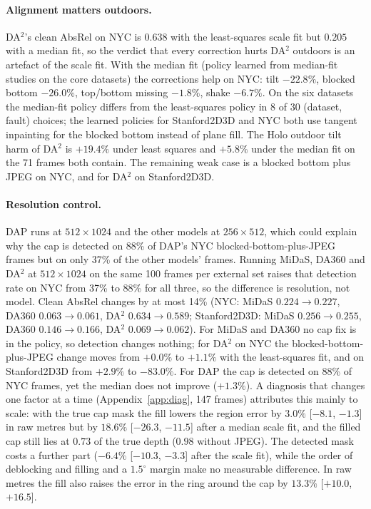\documentclass{article}
\newcommand{\absrel}{AbsRel}
\begin{document}
\paragraph{Alignment matters outdoors.} DA$^2$'s clean \absrel{} on NYC is $0.638$ with the least-squares scale fit but $0.205$ with a median fit, so the verdict that every correction hurts DA$^2$ outdoors is an artefact of the scale fit. With the median fit (policy learned from median-fit studies on the core datasets) the corrections help on NYC: tilt $-22.8\%$, blocked bottom $-26.0\%$, top/bottom missing $-1.8\%$, shake $-6.7\%$. On the six datasets the median-fit policy differs from the least-squares policy in 8 of 30 (dataset, fault) choices; the learned policies for Stanford2D3D and NYC both use tangent inpainting for the blocked bottom instead of plane fill. The Holo outdoor tilt harm of DA$^2$ is $+19.4\%$ under least squares and $+5.8\%$ under the median fit on the 71 frames both contain. The remaining weak case is a blocked bottom plus JPEG on NYC, and for DA$^2$ on Stanford2D3D.

\paragraph{Resolution control.} DAP runs at $512\times1024$ and the other models at $256\times512$, which could explain why the cap is detected on 88\% of DAP's NYC blocked-bottom-plus-JPEG frames but on only 37\% of the other models' frames. Running MiDaS, DA360 and DA$^2$ at $512\times1024$ on the same 100 frames per external set raises that detection rate on NYC from 37\% to 88\% for all three, so the difference is resolution, not model. Clean \absrel{} changes by at most 14\% (NYC: MiDaS $0.224\to0.227$, DA360 $0.063\to0.061$, DA$^2$ $0.634\to0.589$; Stanford2D3D: MiDaS $0.256\to0.255$, DA360 $0.146\to0.166$, DA$^2$ $0.069\to0.062$). For MiDaS and DA360 no cap fix is in the policy, so detection changes nothing; for DA$^2$ on NYC the blocked-bottom-plus-JPEG change moves from $+0.0\%$ to $+1.1\%$ with the least-squares fit, and on Stanford2D3D from $+2.9\%$ to $-83.0\%$. For DAP the cap is detected on 88\% of NYC frames, yet the median does not improve ($+1.3\%$). A diagnosis that changes one factor at a time (Appendix~\ref{app:diag}, 147 frames) attributes this mainly to scale: with the true cap mask the fill lowers the region error by $3.0\%$ [$-8.1$, $-1.3$] in raw metres but by $18.6\%$ [$-26.3$, $-11.5$] after a median scale fit, and the filled cap still lies at $0.73$ of the true depth ($0.98$ without JPEG). The detected mask costs a further part ($-6.4\%$ [$-10.3$, $-3.3$] after the scale fit), while the order of deblocking and filling and a $1.5^\circ$ margin make no measurable difference. In raw metres the fill also raises the error in the ring around the cap by $13.3\%$ [$+10.0$, $+16.5$].
\end{document}
